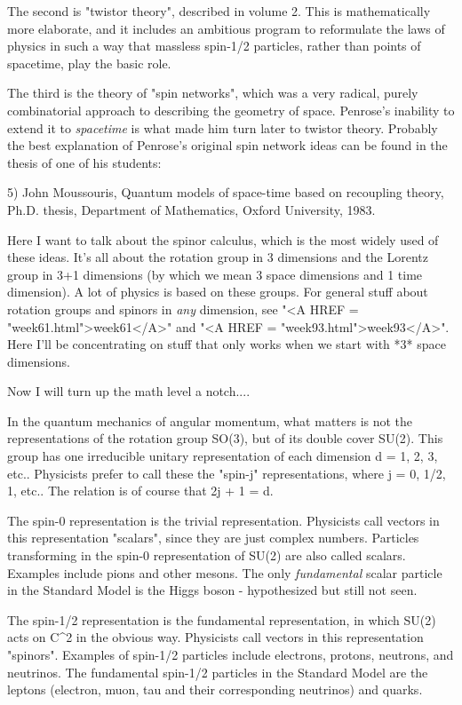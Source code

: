 The second is "twistor theory", described in volume 2.  This is
mathematically more elaborate, and it includes an ambitious program to
reformulate the laws of physics in such a way that massless spin-1/2
particles, rather than points of spacetime, play the basic role.

The third is the theory of "spin networks", which was a very radical,
purely combinatorial approach to describing the geometry of space.
Penrose's inability to extend it to \emph{spacetime} is what made him turn
later to twistor theory.  Probably the best explanation of Penrose's 
original spin network ideas can be found in the thesis of one of his
students: 

5) John Moussouris, Quantum models of space-time based on recoupling
theory, Ph.D. thesis, Department of Mathematics, Oxford University,
1983.

Here I want to talk about the spinor calculus, which is the most widely
used of these ideas.  It's all about the rotation group in 3 dimensions
and the Lorentz group in 3+1 dimensions (by which we mean 3 space
dimensions and 1 time dimension).  A lot of physics is based on these
groups.  For general stuff about rotation groups and spinors in \emph{any}
dimension, see "<A HREF = "week61.html">week61</A>" and "<A HREF = "week93.html">week93</A>".  Here I'll be concentrating on
stuff that only works when we start with *3* space dimensions.

Now I will turn up the math level a notch....

In the quantum mechanics of angular momentum, what matters is not the
representations of the rotation group SO(3), but of its double cover
SU(2).  This group has one irreducible unitary representation of each
dimension d = 1, 2, 3, etc..  Physicists prefer to call these the 
"spin-j" representations, where j = 0, 1/2, 1, etc..  The relation is
of course that 2j + 1 = d.

The spin-0 representation is the trivial representation.  Physicists
call vectors in this representation "scalars", since they are just
complex numbers.  Particles transforming in the spin-0 representation of
SU(2) are also called scalars.  Examples include pions and other mesons.
The only \emph{fundamental} scalar particle in the Standard Model is the
Higgs boson - hypothesized but still not seen.

The spin-1/2 representation is the fundamental representation, in which
SU(2) acts on C^2 in the obvious way.  Physicists call vectors in this
representation "spinors".  Examples of spin-1/2 particles include
electrons, protons, neutrons, and neutrinos.  The fundamental spin-1/2
particles in the Standard Model are the leptons (electron, muon, tau
and their corresponding neutrinos) and quarks.  

